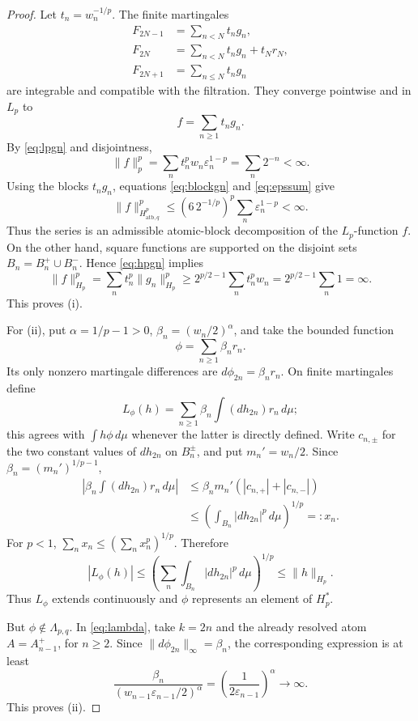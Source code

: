 \documentclass[11pt]{article}
\newcommand{\1}{\mathbf 1}
\begin{document}
\begin{proof}
Let \(t_n=w_n^{-1/p}\).  The finite martingales
\begin{align*}
 F_{2N-1}&=\sum_{n<N}t_ng_n,\\
 F_{2N}&=\sum_{n<N}t_ng_n+t_Nr_N,\\
 F_{2N+1}&=\sum_{n\leq N}t_ng_n
\end{align*}
are integrable and compatible with the filtration.  They converge pointwise
and in \(L_p\) to
\[
 f=\sum_{n\geq1}t_ng_n.
\]
By \eqref{eq:lpgn} and disjointness,
\[
 \|f\|_p^p
 =\sum_n t_n^pw_n\varepsilon_n^{1-p}
 =\sum_n2^{-n}<\infty.
\]
Using the blocks \(t_ng_n\), equations \eqref{eq:blockgn} and
\eqref{eq:epssum} give
\[
 \|f\|_{H^p_{\mathrm{atb},q}}^p
 \leq (6\,2^{-1/p})^p
       \sum_n\varepsilon_n^{1-p}<\infty.
\]
Thus the series is an admissible atomic-block decomposition of the
\(L_p\)-function \(f\).  On the other hand, square functions are supported
on the disjoint sets \(B_n=B_n^+\cup B_n^-\).  Hence \eqref{eq:hpgn}
implies
\[
 \|f\|_{H_p}^p
 =\sum_n t_n^p\|g_n\|_{H_p}^p
 \geq 2^{p/2-1}\sum_n t_n^pw_n
 =2^{p/2-1}\sum_n1=\infty.
\]
This proves (i).

For (ii), put \(\alpha=1/p-1>0\),
\(\beta_n=(w_n/2)^\alpha\), and take the bounded function
\[
 \phi=\sum_{n\geq1}\beta_nr_n.
\]
Its only nonzero martingale differences are
\(d\phi_{2n}=\beta_nr_n\).  On finite martingales define
\[
 L_\phi(h)=\sum_{n\geq1}\beta_n\int (dh_{2n})r_n\,d\mu;
\]
this agrees with \(\int h\phi\,d\mu\) whenever the latter is directly
defined.  Write \(c_{n,\pm}\) for the two constant values of \(dh_{2n}\)
on \(B_n^\pm\), and put \(m_n'=w_n/2\).  Since
\(\beta_n=(m_n')^{1/p-1}\),
\begin{align*}
 \left|\beta_n\int (dh_{2n})r_n\,d\mu\right|
 &\leq \beta_nm_n'(|c_{n,+}|+|c_{n,-}|)\\
 &\leq
 \left(\int_{B_n}|dh_{2n}|^p\,d\mu\right)^{1/p}=:x_n.
\end{align*}
For \(p<1\), \(\sum_nx_n\leq(\sum_nx_n^p)^{1/p}\).  Therefore
\[
 |L_\phi(h)|\leq\left(\sum_n\int_{B_n}|dh_{2n}|^p\,d\mu\right)^{1/p}
 \leq\|h\|_{H_p}.
\]
Thus \(L_\phi\) extends continuously and \(\phi\) represents an element of
\(H_p^*\).

But \(\phi\notin\Lambda_{p,q}\).  In \eqref{eq:lambda}, take \(k=2n\)
and the already resolved atom \(A=A_{n-1}^+\), for \(n\geq2\).  Since
\(\|d\phi_{2n}\|_\infty=\beta_n\), the corresponding expression is at
least
\[
 \frac{\beta_n}{(w_{n-1}\varepsilon_{n-1}/2)^\alpha}
 =\left(\frac{1}{2\varepsilon_{n-1}}\right)^\alpha
 \longrightarrow\infty.
\]
This proves (ii).
\end{proof}
\end{document}
